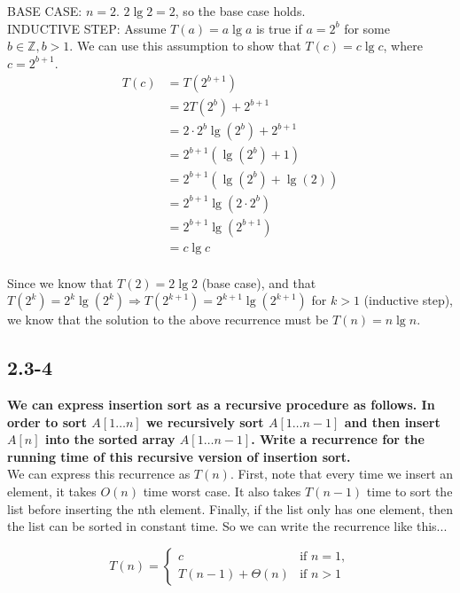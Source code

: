 \documentclass[11pt]{article}
\begin{document}
 BASE CASE: $n = 2$.  $2 \lg 2 = 2$, so the base case holds. \\

 INDUCTIVE STEP: Assume $T(a) = a \lg a$ is true if $a = 2^b$ for some $b \in \mathbb{Z}, b > 1$. 
 We can use this assumption to show that $T(c) = c \lg c$, where $c = 2^{b+1}$.
 \begin{align*}
   && T(c) &= T(2^{b+1}) && \\
   && &= 2T(2^b) + 2^{b+1} && \\
   && &= 2 \cdot 2^b \lg (2^b) + 2^{b+1} && \\
   && &= 2^{b+1}(\lg(2^b) + 1) && \\
   && &= 2^{b+1}(\lg(2^b) + \lg(2)) && \\
   && &= 2^{b+1}\lg(2 \cdot 2^b) && \\
   && &= 2^{b+1}\lg(2^{b+1}) && \\
   && &= c \lg c && \\
 \end{align*}

 Since we know that $T(2) = 2 \lg 2$ (base case), and that $T(2^k) = 2^k \lg (2^k) \Rightarrow
 T(2^{k+1}) = 2^{k+1} \lg (2^{k+1})$ for $k > 1$ (inductive step), we know that the solution 
 to the above recurrence must be $T(n) = n \lg n$. \newpage

 \subsection*{2.3-4}
 \textbf{We can express insertion sort as a recursive procedure as follows. In order to sort 
 $A[1 \ldots n]$ we recursively sort $A[1 \ldots n-1]$ and then insert $A[n]$ into the sorted array 
 $A[1 \ldots n-1]$. Write a recurrence for the running time of this recursive version of insertion 
 sort.} \\

 We can express this recurrence as $T(n)$.  First, note that every time we insert an element, it takes 
 $O(n)$ time worst case.  It also takes $T(n-1)$ time to sort the list before inserting the nth element.
 Finally, if the list only has one element, then the list can be sorted in constant time.
 So we can write the recurrence like this...

 \[
   T(n) = 
   \begin{cases}
     c & \text{if } n = 1, \\
     T(n-1) + \Theta (n) & \text{if } n > 1
   \end{cases}
 \]
\end{document}
